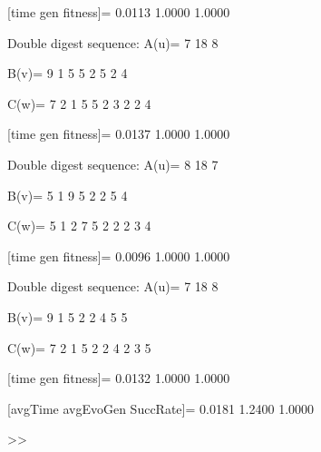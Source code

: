 [time gen fitness]=
    0.0113    1.0000    1.0000

Double digest sequence:
A(u)=
     7    18     8

B(v)=
     9     1     5     5     2     5     2     4

C(w)=
     7     2     1     5     5     2     3     2     2     4

[time gen fitness]=
    0.0137    1.0000    1.0000

Double digest sequence:
A(u)=
     8    18     7

B(v)=
     5     1     9     5     2     2     5     4

C(w)=
     5     1     2     7     5     2     2     2     3     4

[time gen fitness]=
    0.0096    1.0000    1.0000

Double digest sequence:
A(u)=
     7    18     8

B(v)=
     9     1     5     2     2     4     5     5

C(w)=
     7     2     1     5     2     2     4     2     3     5

[time gen fitness]=
    0.0132    1.0000    1.0000

[avgTime  avgEvoGen  SuccRate]=
    0.0181    1.2400    1.0000

>> 